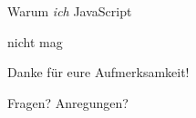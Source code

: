 \documentclass{beamer}
\begin{document}

\begin{frame}
\Huge{
\centerline{Warum \textit{ich} JavaScript}
\centerline{nicht mag}
}
\end{frame}


\begin{frame}
\Huge{\centerline{Danke für eure Aufmerksamkeit!}}
\end{frame}

\begin{frame}
\Huge{\centerline{Fragen? Anregungen?}}
\end{frame}

\end{document}
